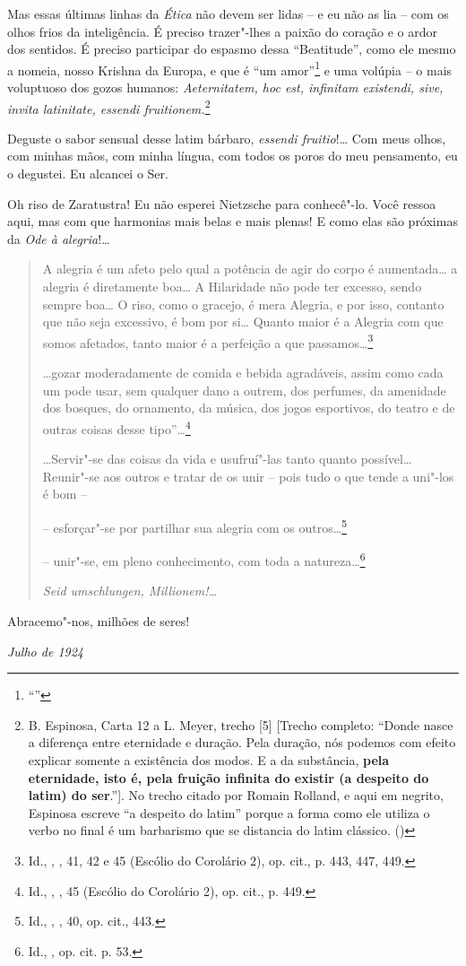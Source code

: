 Mas essas últimas linhas da \emph{Ética} não devem ser lidas -- e eu não
as lia -- com os olhos frios da inteligência. É preciso trazer"-lhes a
paixão do coração e o ardor dos sentidos. É preciso participar do
espasmo dessa ``Beatitude'', como ele mesmo a nomeia, nosso Krishna da
Europa, e que é ``um amor''\footnote{``{}''} e uma volúpia -- o mais voluptuoso dos gozos humanos:
\emph{Aeternitatem, hoc est, infinitam existendi, sive, invita
latinitate, essendi fruitionem.}\footnote{B. Espinosa, Carta 12 a L.
  Meyer, trecho {[}5{]} {[}Trecho completo: ``Donde nasce a diferença
  entre eternidade e duração. Pela duração, nós podemos com efeito
  explicar somente a existência dos modos. E a da substância,
  \textbf{pela eternidade, isto é, pela fruição infinita do existir (a
  despeito do latim) do ser}.''{]}. No trecho citado por Romain Rolland,
  e aqui em negrito, Espinosa escreve ``a despeito do latim'' porque a
  forma como ele utiliza o verbo {} no final é um barbarismo que
  se distancia do latim clássico. (\scalebox{0.8}{N.~T.})}

Deguste o sabor sensual desse latim bárbaro, \emph{essendi fruitio}!\ldots{}
Com meus olhos, com minhas mãos, com minha língua, com todos os poros do
meu pensamento, eu o degustei. Eu alcancei o Ser.

Oh riso de Zaratustra! Eu não esperei Nietzsche para conhecê"-lo. Você
ressoa aqui, mas com que harmonias mais belas e mais plenas! E como elas
são próximas da \emph{Ode à alegria}!\ldots{}

\begin{quote}
A alegria é um afeto pelo qual a potência de agir do corpo é
aumentada\ldots{} a alegria é diretamente boa\ldots{} A Hilaridade não pode ter
excesso, sendo sempre boa\ldots{} O riso, como o gracejo, é mera Alegria, e
por isso, contanto que não seja excessivo, é bom por si\ldots{} Quanto maior
é a Alegria com que somos afetados, tanto maior é a perfeição a que
passamos\ldots{}\footnote{Id., {}, \scalebox{0.8}{IV}, 41, 42 e 45 (Escólio do
  Corolário 2), op. cit., p. 443, 447, 449.}

\ldots{}gozar moderadamente de comida e bebida agradáveis, assim como cada
um pode usar, sem qualquer dano a outrem, dos perfumes, da amenidade dos
bosques, do ornamento, da música, dos jogos esportivos, do teatro e de
outras coisas desse tipo''\ldots{}\footnote{Id., {}, \scalebox{0.8}{IV}, 45
  (Escólio do Corolário 2), op. cit., p. 449.}

\ldots{}Servir"-se das coisas da vida e usufruí"-las tanto quanto possível\ldots{}
Reunir"-se aos outros e tratar de os unir -- pois tudo o que tende a
uni"-los é bom --

-- esforçar"-se por partilhar sua alegria com os outros\ldots{}\footnote{Id.,
  {}, \scalebox{0.8}{IV}, 40, op. cit., 443.}

-- unir"-se, em pleno conhecimento, com toda a natureza\ldots{}\footnote{Id.,
  {}, op. cit. p. 53.}

\emph{Seid umschlungen, Millionem!\ldots{}}
\end{quote}

Abracemo"-nos, milhões de seres!

\begin{flushright}
\emph{Julho de 1924}
\end{flushright}